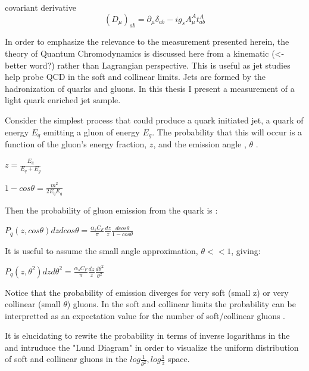covariant derivative
\begin{equation}
\left(D_{\mu}\right)_{a b}=\partial_{\mu} \delta_{a b}-i g_{s} A_{\mu}^{A} t_{a b}^{A}
\end{equation}

In order to emphasize the relevance to the measurement presented herein, the theory of Quantum Chromodynamics is discussed here from a kinematic (<- better word?) rather than Lagrangian perspective. This is useful as jet studies help probe QCD in the soft and collinear limits. 
Jets are formed by the hadronization of quarks and gluons. In this thesis I present a measurement of a light quark enriched jet sample. 



Consider the simplest process that could produce a quark initiated jet, a quark of energy $E_q$  emitting a gluon of energy $E_g$. The probability that this will occur is a function of the gluon's energy fraction, $z$, and the emission angle , $\theta$  \cite{Larkoski:2017fip}.\newline


$z = \frac{E_g}{E_q + E_g}$\newline

$1 - cos \theta = \frac{m^2}{2 E_q E_g}$\newline

Then the probability of gluon emission from the quark is :


$P_q(z,cos \theta) dz d cos \theta = \frac{\alpha_s C_F}{\pi}  \frac{dz}{z} \frac{dcos \theta}{1 - cos \theta}  $\newline

It is useful to assume the small angle approximation, $\theta << 1$, giving:\newline


$P_q(z,\theta^2) dz d \theta^2 = \frac{\alpha_s C_F}{\pi}  \frac{dz}{z} \frac{d \theta^2}{ \theta^2}  $\newline

Notice that the probability of emission diverges for very soft (small z) or very collinear (small $\theta$) gluons. In the soft and collinear limits the probability can be interpretted as an expectation value for the number of soft/collinear gluons \cite{Larkoski:2017fip}.

It is elucidating to rewite the probability in terms of inverse logarithms in the and intruduce the "Lund Diagram" in order to visualize the uniform distribution of soft and collinear gluons in the $log \frac{1}{ \theta^2} , log\frac{1}{z} $ space.

